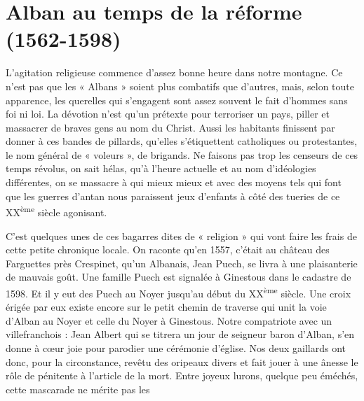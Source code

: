 
\section*{Alban au temps de la réforme (1562-1598)}

\lettrine{L}{'}agitation religieuse commence d'assez bonne heure dans
notre montagne. Ce n'est pas que les « Albans » soient plus combatifs
que d'autres, mais, selon toute apparence, les querelles qui
s'engagent sont assez souvent le fait d'hommes sans foi ni loi.
La dévotion n'est qu'un prétexte pour terroriser un pays, piller et
massacrer de braves gens au nom du Christ. Aussi les habitants
finissent par donner à ces bandes de pillards, qu'elles s'étiquettent
catholiques ou protestantes, le nom général de « voleurs », de
brigands. Ne faisons pas trop les censeurs de ces temps révolus,
on sait hélas, qu'à l'heure actuelle et au nom d'idéologies
différentes, on se massacre à qui mieux mieux et avec des moyens
tels qui font que les guerres d'antan nous paraissent jeux d'enfants
à côté des tueries de ce XX\textsuperscript{ème} siècle agonisant.

\lettrine{C}{'}est quelques unes de ces bagarres dites de
« religion » qui vont faire les frais de cette petite chronique
locale. On raconte qu'en 1557, c'était au château des Farguettes
près Crespinet, qu'un Albanais, Jean Puech, se livra à une plaisanterie
de mauvais goût. Une famille Puech est signalée à Ginestous dans
le cadastre de 1598. Et il y eut des Puech au Noyer jusqu'au début
du XX\textsuperscript{ème} siècle. Une croix érigée par eux existe
encore sur le petit chemin de traverse qui unit la voie d'Alban au
Noyer et celle du Noyer à Ginestous. Notre compatriote avec un
villefranchois : Jean Albert qui se titrera un jour de seigneur
baron d'Alban, s'en donne à cœur joie pour parodier une cérémonie
d'église. Nos deux gaillards ont donc, pour la circonstance, revêtu
des oripeaux divers et fait jouer à une ânesse le rôle de pénitente
à l'article de la mort. Entre joyeux lurons, quelque peu éméchés,
cette mascarade ne mérite pas les
